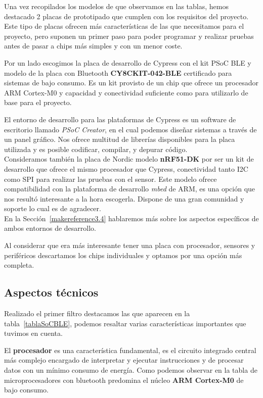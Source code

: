 Una vez recopilados los modelos de que observamos en las tablas, hemos destacado 2 placas de prototipado que cumplen con los requisitos del proyecto. Este tipo de placas ofrecen más características de las que necesitamos para el proyecto, pero suponen un primer paso para poder programar y realizar pruebas antes de pasar a chips más simples y con un menor coste. 

Por un lado escogimos la placa de desarrollo de Cypress con el kit PSoC BLE y modelo de la placa con Bluetooth \textbf{CY8CKIT-042-BLE} certificado para sistemas de bajo consumo. Es un kit provisto de un chip que ofrece un procesador ARM Cortex-M0 y capacidad y conectividad suficiente como para utilizarlo de base para el proyecto.

El entorno de desarrollo para las plataformas de Cypress es un software de escritorio llamado \textit{PSoC Creator}, en el cual podemos diseñar sistemas a través de un panel gráfico. Nos ofrece multitud de librerías disponibles para la placa utilizada y es posible codificar, compilar, y depurar código.\\

Consideramos también la placa de Nordic modelo \textbf{nRF51-DK} por ser un kit de desarrollo que ofrece el mismo procesador que Cypress, conectividad tanto I2C como SPI para realizar las pruebas con el sensor. 
Este modelo ofrece compatibilidad con la plataforma de desarrollo \textit{mbed} de ARM, es una opción que nos resultó interesante a la hora escogerla. Dispone de una gran comunidad y soporte lo cual es de agradecer.\\

En la Sección~\ref{makereference3.4} hablaremos más sobre los aspectos específicos de ambos entornos de desarrollo.

Al considerar que era más interesante tener una placa con procesador, sensores y periféricos descartamos los chips individuales y optamos por una opción más completa.

\subsection{Aspectos técnicos}
\label{makereference3.3.1}

Realizado el primer filtro destacamos las que aparecen en la tabla~\ref{tablaSoCBLE}, podemos resaltar varias características importantes que tuvimos en cuenta.

El \textbf{procesador} es una característica fundamental, es el circuito integrado central más complejo encargado de interpretar y ejecutar instrucciones y de procesar datos con un mínimo consumo de energía. 
Como podemos observar en la tabla de microprocesadores con bluetooth predomina el núcleo \textbf{ARM Cortex-M0} de bajo consumo.

